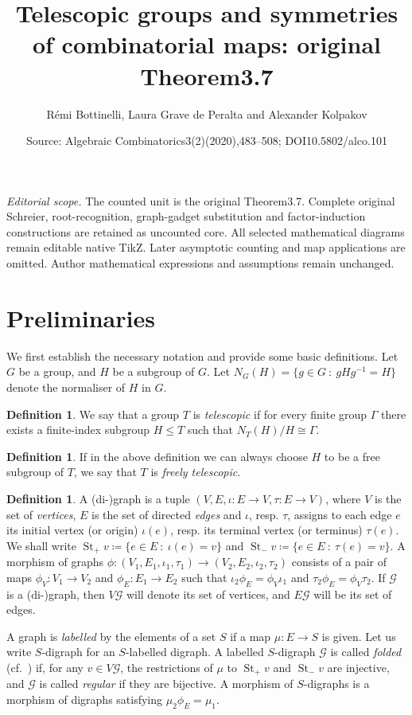 \documentclass[10pt,a4paper]{amsart}
\title[Finite normalizer-quotient realization]{Telescopic groups and symmetries of combinatorial maps: original Theorem3.7}
\author{R\'emi Bottinelli, Laura Grave de Peralta and Alexander Kolpakov}
\date{Source: Algebraic Combinatorics3(2)(2020),483--508; DOI10.5802/alco.101}
\newcommand{\cf}{cf.\ }
\theoremstyle{definition}
\newtheorem{defi}[theo]{Definition}
\newcommand{\cG}{\mathcal{G}}
\DeclareMathOperator{\St}{St}
\begin{document}
\maketitle
\noindent\textit{Editorial scope.} The counted unit is the original Theorem3.7. Complete original Schreier, root-recognition, graph-gadget substitution and factor-induction constructions are retained as uncounted core. All selected mathematical diagrams remain editable native TikZ. Later asymptotic counting and map applications are omitted. Author mathematical expressions and assumptions remain unchanged.
\setcounter{section}{1}
\section{Preliminaries}

We first establish the necessary notation and provide some basic definitions. Let $G$ be a group, and $H$ be a subgroup of $G$. Let $N_G(H) = \{ g \in G\ :\ gHg^{-1} = H \}$ denote the normaliser of $H$ in $G$. 

\begin{defi}\label{defn:telescopic}
We say that a group $T$ is \emph{telescopic} if for every finite group $\Gamma$ there exists a finite-index subgroup $H \leq T$ such that $N_T(H)/H \cong \Gamma$. 
\end{defi}

\begin{defi}
If in the above definition we can always choose $H$ to be a free subgroup of $T$, we say that $T$ is \emph{freely telescopic}. 
\end{defi}

\begin{defi}
A (di-)graph is a tuple $(V,E,{\iota}:E\to V,{\tau}:E\to V)$, where $V$ is the set of \emph{vertices}, $E$ is the set of directed \emph{edges} and ${\iota}$, resp. ${\tau}$, assigns to each edge $e$ its initial vertex (or origin) ${\iota}(e)$, resp. its terminal vertex (or terminus) ${\tau}(e)$. We shall write $\St_+v \coloneqq \{e\in E\ :\ {\iota}(e) = v\}$ and $\St_-v \coloneqq \{e\in E\ :\ {\tau}(e) = v\}$. A morphism of graphs ${\phi}:(V_{1},E_{1},{\iota}_{1},{\tau}_{1}) \to (V_{2},E_{2},{\iota}_{2},{\tau}_{2})$ consists of a pair of maps ${\phi}_V:V_{1}\to V_{2}$ and ${\phi}_E:E_{1}\to E_{2}$ such that ${\iota}_{2}{\phi}_E = {\phi}_V{\iota}_{1}$ and ${\tau}_{2}{\phi}_E = {\phi}_V{\tau}_{2}$. If $\cG$ is a (di-)graph, then $V\cG$ will denote its set of vertices, and $E\cG$ will be its set of edges.

A graph is \emph{labelled} by the elements of a set $S$ if a map ${\mu}:E\to S$ is given. Let us write $S$-digraph for an $S$-labelled digraph. A labelled $S$-digraph $\cG$ is called \emph{folded} {\upshape(}\cf \cite{St}{\upshape)} if, for any $v \in V\cG$, the restrictions of ${\mu}$ to $\St_+v$ and $\St_-v$ are injective, and $\cG$ is called \emph{regular} if they are bijective. A morphism of $S$-digraphs is a morphism of digraphs satisfying ${\mu}_{2}{\phi}_E = {\mu}_{1}$.
\end{defi}
\end{document}
